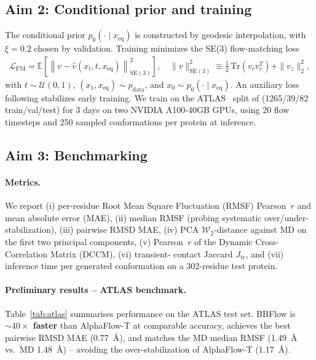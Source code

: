 \documentclass[12pt]{article}
\begin{document}
\subsection{Aim 2: Conditional prior and training}
The conditional prior $p_0(\cdot \mid x_{\mathrm{eq}})$ is constructed by
geodesic interpolation, with $\xi = 0.2$ chosen by validation. Training
minimizes the SE(3) flow-matching loss
\begin{align}
  \mathcal{L}_{\mathrm{FM}}
  = \mathbb{E}\!\left[\left\| v - \hat{v}(x_t, t, x_{\mathrm{eq}})\right\|^2_{\mathrm{SE}(3)}\right],
  \quad \|v\|^2_{\mathrm{SE}(3)} \equiv \tfrac{1}{2}\,\mathrm{Tr}(v_r v_r^T) + \|v_z\|_2^2,
\end{align}
with $t \sim \mathcal{U}(0,1)$, $(x_1, x_{\mathrm{eq}}) \sim p_{\mathrm{data}}$,
and $x_0 \sim p_0(\cdot \mid x_{\mathrm{eq}})$. An auxiliary loss following
\cite{yim2023se3} stabilizes early training. We train on the
ATLAS~\cite{vandermeersche2024atlas} split of \cite{jing2024alphaflow}
(1265/39/82 train/val/test) for 3 days on two NVIDIA A100-40GB GPUs, using 20
flow timesteps and 250 sampled conformations per protein at inference.

\subsection{Aim 3: Benchmarking}

\paragraph{Metrics.}
We report (i) per-residue Root Mean Square Fluctuation (RMSF) Pearson~$r$ and
mean absolute error (MAE), (ii) median RMSF (probing systematic
over/under-stabilization), (iii) pairwise RMSD MAE, (iv) PCA
$\mathcal{W}_2$-distance against MD on the first two principal components,
(v) Pearson~$r$ of the Dynamic Cross-Correlation Matrix (DCCM), (vi) transient-
contact Jaccard $J_{\mathrm{tr}}$, and (vii) inference time per generated
conformation on a 302-residue test protein.

\paragraph{Preliminary results -- ATLAS benchmark.}
Table~\ref{tab:atlas} summarises performance on the ATLAS test set. BBFlow is
\textbf{$\sim 40\times$ faster} than AlphaFlow-T at comparable accuracy, achieves
the best pairwise RMSD MAE (0.77~\AA), and matches the MD median RMSF (1.49~\AA{}
vs.\ MD 1.48~\AA) -- avoiding the over-stabilization of AlphaFlow-T (1.17~\AA).
\end{document}
